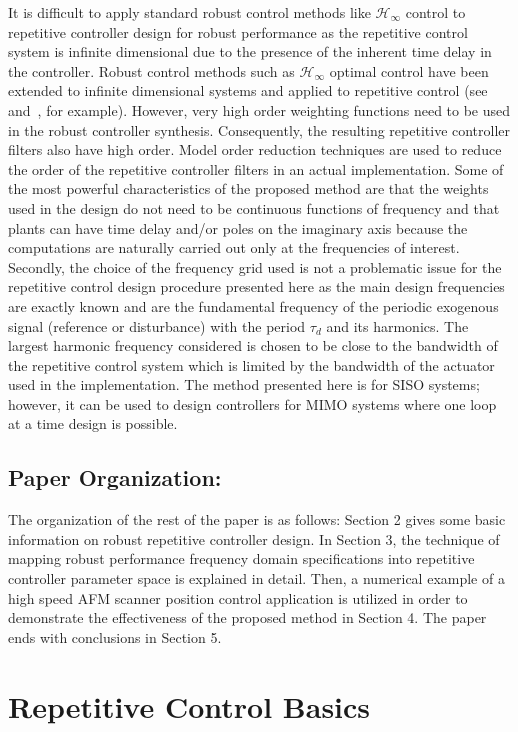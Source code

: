 \documentclass[12pt,draftcls,onecolumn]{IEEEtran}
\begin{document}
It is difficult to apply standard robust control methods like
$\mathcal{H}_{\infty}$ control to repetitive controller design for robust
performance as the repetitive control system is infinite
dimensional due to the presence of the inherent time delay in the
controller. Robust control methods such as $\mathcal{H}_{\infty}$ optimal
control have been extended to infinite dimensional systems and
applied to repetitive control (see~\cite{SOJ:95} and~\cite{PeO:97}, for example).
However, very high order weighting functions need to be used in
the robust controller synthesis. Consequently, the resulting
repetitive controller filters also have high order. Model order
reduction techniques are used to reduce the order of the
repetitive controller filters in an actual implementation. Some of
the most powerful characteristics of the proposed method are that
the weights used in the design do not need to be continuous
functions of frequency and that plants can have time delay and/or
poles on the imaginary axis because the computations are naturally
carried out only at the frequencies of interest. Secondly, the
choice of the frequency grid used is not a problematic issue for
the repetitive control design procedure presented here as the main
design frequencies are exactly known and are the fundamental
frequency of the periodic exogenous signal (reference or
disturbance) with the period $\tau_d$ and its harmonics. The
largest harmonic frequency considered is chosen to be close to the
bandwidth of the repetitive control system which is limited by the
bandwidth of the actuator used in the implementation. The method
presented here is for SISO systems; however, it can be used to
design controllers for MIMO systems where one loop at a time
design is possible.

\subsection*{Paper Organization:}

The organization of the rest of the paper is as follows: Section 2
gives some basic information on robust repetitive controller
design. In Section 3, the technique of mapping robust performance
frequency domain specifications into repetitive controller
parameter space is explained in detail. Then, a numerical example
of a high speed AFM scanner position control application is
utilized in order to demonstrate the effectiveness of the proposed
method in Section 4. The paper ends with conclusions in Section 5.

\section{Repetitive Control Basics}
\end{document}
